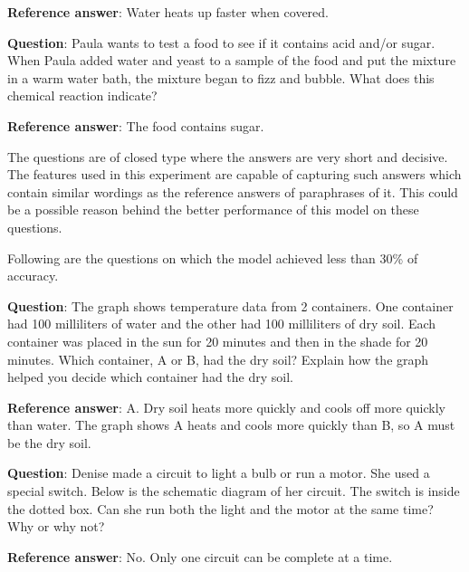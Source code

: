 \noindent \textbf{Reference answer}: Water heats up faster when covered.

\vspace{5mm} 

\noindent \textbf{Question}: Paula wants to test a food to see if it contains acid and/or sugar. When Paula added water and yeast to a sample of the food and put the mixture in a warm water bath, the mixture began to fizz and bubble. What does this chemical reaction indicate?

\noindent \textbf{Reference answer}: The food contains sugar.

\vspace{5mm} 


The questions are of closed type where the answers are very short and decisive. The features used in this experiment are capable of capturing such answers which contain similar wordings as the reference answers of paraphrases of it. This could be a possible reason behind the better performance of this model on these questions.

\vspace{3mm} 

Following are the questions on which the model achieved less than 30\% of accuracy. 

\vspace{5mm} 


\noindent \textbf{Question}: The graph shows temperature data from 2 containers. One container had 100 milliliters of water and the other had 100 milliliters of dry soil. Each container was placed in the sun for 20 minutes and then in the shade for 20 minutes. Which container, A or B, had the dry soil? Explain how the graph helped you decide which container had the dry soil.

\noindent \textbf{Reference answer}: A. Dry soil heats more quickly and cools off more quickly than water. The graph shows A heats and cools more quickly than B, so A must be the dry soil.

\vspace{5mm}

\noindent \textbf{Question}: Denise made a circuit to light a bulb or run a motor. She used a special switch. Below is the schematic diagram of her circuit. The switch is inside the dotted box. Can she run both the light and the motor at the same time? Why or why not?

\noindent \textbf{Reference answer}: No. Only one circuit can be complete 
at a time.

\vspace{5mm}
 

